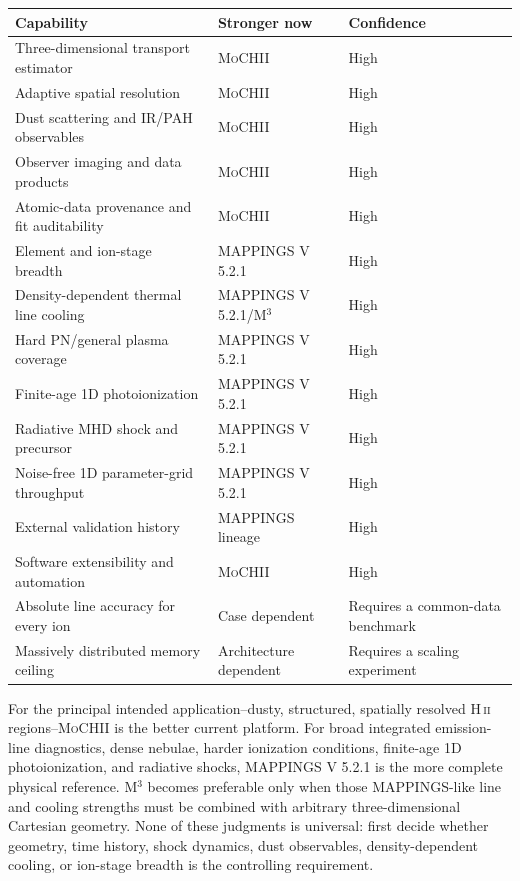 \documentclass[english,a4paper]{my_memo}
\newcommand{\MoCHII}{\textsc{MoCHII}}
\newcommand{\Mthree}{M$^3$}
\newcommand{\Mappings}{MAPPINGS V 5.2.1}
\begin{document}
\begin{center}
\begin{tabular}{P{0.46\textwidth}P{0.20\textwidth}P{0.20\textwidth}}
\toprule
Capability & Stronger now & Confidence \\
\midrule
Three-dimensional transport estimator & \MoCHII{} & High \\
Adaptive spatial resolution & \MoCHII{} & High \\
Dust scattering and IR/PAH observables & \MoCHII{} & High \\
Observer imaging and data products & \MoCHII{} & High \\
Atomic-data provenance and fit auditability & \MoCHII{} & High \\
Element and ion-stage breadth & \Mappings{} & High \\
Density-dependent thermal line cooling & \Mappings{}/\Mthree{} & High \\
Hard PN/general plasma coverage & \Mappings{} & High \\
Finite-age 1D photoionization & \Mappings{} & High \\
Radiative MHD shock and precursor & \Mappings{} & High \\
Noise-free 1D parameter-grid throughput & \Mappings{} & High \\
External validation history & MAPPINGS lineage & High \\
Software extensibility and automation & \MoCHII{} & High \\
Absolute line accuracy for every ion & Case dependent & Requires a
common-data benchmark \\
Massively distributed memory ceiling & Architecture dependent & Requires
a scaling experiment \\
\bottomrule
\end{tabular}
\end{center}

For the principal intended application--dusty, structured, spatially
resolved H\,\textsc{ii} regions--\MoCHII{} is the better current platform.
For broad integrated emission-line diagnostics, dense nebulae, harder
ionization conditions, finite-age 1D photoionization, and radiative shocks,
\Mappings{} is the more complete physical reference.  \Mthree{} becomes
preferable only when those MAPPINGS-like line and cooling strengths must be
combined with arbitrary three-dimensional Cartesian geometry.  None of
these judgments is universal: first decide whether geometry, time history,
shock dynamics, dust observables, density-dependent cooling, or ion-stage
breadth is the controlling requirement.
\end{document}
